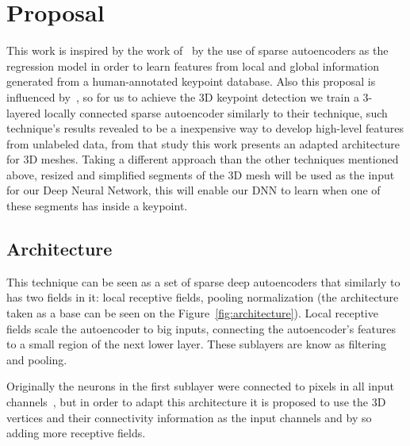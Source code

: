 \documentclass{comjnl}
\begin{document}
\section{Proposal} \label{Proposal}
This work is inspired by the work of~\cite{DNN} by the use of
sparse autoencoders as the regression model in order to learn features
from local and global information generated from a human-annotated
keypoint database. Also this proposal is influenced by~\cite{UnsLearning},
so for us to achieve the 3D keypoint detection we train a 3-layered locally
connected sparse autoencoder similarly to their technique, such
technique's results revealed to be a inexpensive way to develop
high-level features from unlabeled data, from that study this work
presents an adapted architecture for 3D meshes. Taking a different approach
than the other techniques mentioned above, resized and simplified segments
of the 3D mesh will be used as the input for our Deep Neural Network,
this will enable our DNN to learn when one of these segments has inside
a keypoint.

\subsection{Architecture}
This technique can be seen as a set of sparse deep autoencoders that
similarly to~\cite{UnsLearning} has two fields in it: local receptive fields,
pooling normalization (the architecture taken as a base can be seen
on the Figure~\ref{fig:architecture}). Local receptive fields scale the
autoencoder to big inputs, connecting the autoencoder's features to a small
region of the next lower layer. These sublayers are know as filtering and
pooling.

Originally the neurons in the first sublayer were connected to
pixels in all input channels~\cite{UnsLearning}, but in order to adapt
this architecture it is proposed to use the 3D vertices and their
connectivity information as the input channels and by so adding more
receptive fields.
\end{document}
